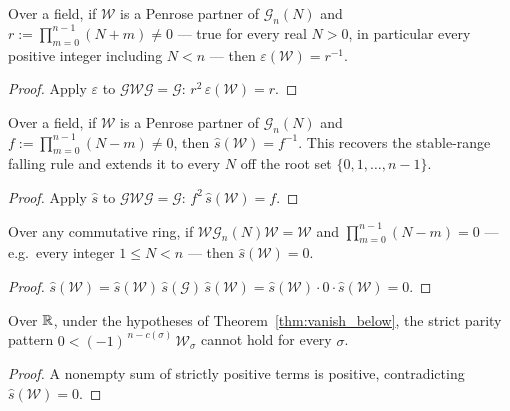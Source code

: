 \begin{theorem}\label{thm:rising_conditional}
\leanok
{}
Over a field, if $\mathcal W$ is a Penrose partner of $\mathcal G_n(N)$
and $r:=\prod_{m=0}^{n-1}(N+m)\neq0$ --- true for every real $N>0$, in
particular every positive integer including $N<n$ --- then
$\varepsilon(\mathcal W)=r^{-1}$.
\end{theorem}
\begin{proof}
\leanok
{}
Apply $\varepsilon$ to $\mathcal G\mathcal W\mathcal G=\mathcal G$:
$r^{2}\,\varepsilon(\mathcal W)=r$.
\end{proof}

\begin{theorem}\label{thm:falling_conditional}
\leanok
{}
Over a field, if $\mathcal W$ is a Penrose partner of $\mathcal G_n(N)$
and $f:=\prod_{m=0}^{n-1}(N-m)\neq0$, then $\hat s(\mathcal W)=f^{-1}$.
This recovers the stable-range falling rule and extends it to every $N$
off the root set $\{0,1,\dots,n-1\}$.
\end{theorem}
\begin{proof}
\leanok
{}
Apply $\hat s$ to $\mathcal G\mathcal W\mathcal G=\mathcal G$:
$f^{2}\,\hat s(\mathcal W)=f$.
\end{proof}

\begin{theorem}\label{thm:vanish_below}
\leanok
{}
Over any commutative ring, if
$\mathcal W\mathcal G_n(N)\mathcal W=\mathcal W$ and
$\prod_{m=0}^{n-1}(N-m)=0$ --- e.g.\ every integer $1\le N<n$ --- then
$\hat s(\mathcal W)=0$.
\end{theorem}
\begin{proof}
\leanok
{}
$\hat s(\mathcal W)
=\hat s(\mathcal W)\,\hat s(\mathcal G)\,\hat s(\mathcal W)
=\hat s(\mathcal W)\cdot 0\cdot\hat s(\mathcal W)=0$.
\end{proof}

\begin{theorem}\label{thm:sign_breakdown}
\leanok
{}
Over $\mathbb{R}$, under the hypotheses of Theorem~\ref{thm:vanish_below}, the
strict parity pattern $0<(-1)^{\,n-c(\sigma)}\,\mathcal W_\sigma$ cannot
hold for every $\sigma$.
\end{theorem}
\begin{proof}
\leanok
{}
A nonempty sum of strictly positive terms is positive, contradicting
$\hat s(\mathcal W)=0$.
\end{proof}

